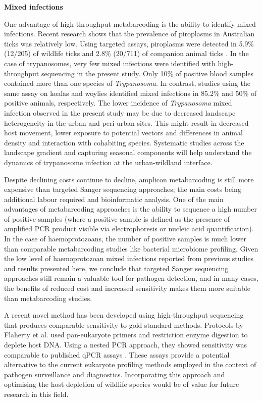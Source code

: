 \documentclass[a4paper, nobind]{templates/ociamthesis}
\begin{document}
\textbf{Mixed infections}

One advantage of high-throughput metabarcoding is the ability to identify mixed infections. Recent research shows that the prevalence of piroplasms in Australian ticks was relatively low.
Using targeted assays, piroplasms were detected in 5.9\% (12/205) of wildlife ticks \autocite{lohMolecularSurveillancePiroplasms2018} and 2.8\% (20/711) of companion animal ticks \autocite{greayEndemicExoticNovel2018}.
In the case of trypanosomes, very few mixed infections were identified with high-throughput sequencing in the present study.
Only 10\% of positive blood samples contained more than one species of \emph{Trypanosoma}.
In contrast, studies using the same assay on koalas and woylies identified mixed infections in 85.2\% \autocite{barbosaIncreasedGeneticDiversity2017} and 50\% \autocite{cooperNextGenerationSequencing2018} of positive animals, respectively.
The lower incidence of \emph{Trypanosoma} mixed infection observed in the present study may be due to decreased landscape heterogeneity in the urban and peri-urban sites.
This might result in decreased host movement, lower exposure to potential vectors and differences in animal density and interaction with cohabiting species.
Systematic studies across the landscape gradient and capturing seasonal components will help understand the dynamics of trypanosome infection at the urban-wildland interface.

Despite declining costs continue to decline, amplicon metabarcoding is still more expensive than targeted Sanger sequencing approaches; the main costs being additional labour required and bioinformatic analysis.
One of the main advantages of metabarcoding approaches is the ability to sequence a high number of positive samples (where a positive sample is defined as the presence of amplified PCR product visible via electrophoresis or nucleic acid quantification).
In the case of haemoprotozoans, the number of positive samples is much lower than comparable metabarcoding studies like bacterial microbiome profiling.
Given the low level of haemoprotozoan mixed infections reported from previous studies \autocite{hugginsNovelMetabarcodingDiagnostic2019} and results presented here, we conclude that targeted Sanger sequencing approaches still remain a valuable tool for pathogen detection, and in many cases, the benefits of reduced cost and increased sensitivity makes them more suitable than metabarcoding studies.

A recent novel method has been developed using high-throughput sequencing that produces comparable sensitivity to gold standard methods. Protocols by Flaherty et al. \autocite*{flahertyRestrictionEnzymeDigestion2018,flahertySensitiveUniversalDetection2021} used pan-eukaryote primers and restriction enzyme digestion to deplete host DNA. Using a nested PCR approach, they showed sensitivity was comparable to published qPCR assays \autocite{flahertySensitiveUniversalDetection2021}.
These assays provide a potential alternative to the current eukaryote profiling methods employed in the context of pathogen surveillance and diagnostics.
Incorporating this approach and optimising the host depletion of wildlife species would be of value for future research in this field.
\end{document}

